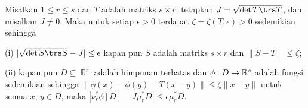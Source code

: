  Misalkan $1\le r\le s$ dan $T$ adalah matriks
$s\times r$; tetapkan $J=\sqrt{\det T\trs T}$, dan misalkan $J\ne 0$.
Maka untuk setiap $\epsilon>0$ terdapat
$\zeta=\zeta(T,\epsilon)>0$ sedemikian sehingga

(i) $|\sqrt{\det S\trs S}-J|\le\epsilon$ kapan pun $S$ adalah matriks
$s\times r$ dan $\|S-T\|\le\zeta$;

(ii) kapan pun $D\subseteq\BbbR^r$ adalah himpunan terbatas dan
$\phi:D\to\Bbb R^s$ adalah fungsi sedemikian sehingga
$\|\phi(x)-\phi(y)-T(x-y)\|\le\zeta\|x-y\|$ untuk semua $x$, $y\in D$,
maka $|\nu_r^*\phi[D]-J\mu_r^*D|\le\epsilon\mu_r^*D$.

